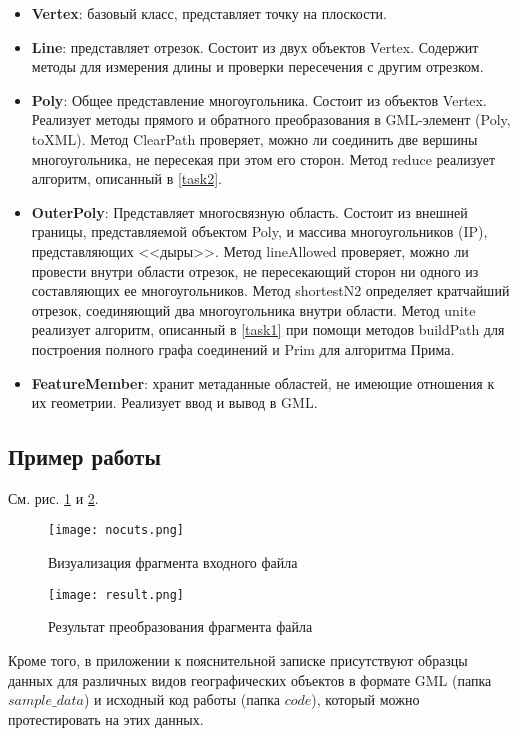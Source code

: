 \begin{itemize}
\item \textbf{Vertex}: базовый класс, представляет точку на плоскости.
\item \textbf{Line}: представляет отрезок. Состоит из двух объектов Vertex. Содержит методы для измерения длины и проверки пересечения с другим отрезком.
\item \textbf{Poly}: Общее представление многоугольника. Состоит из объектов Vertex. Реализует методы прямого и обратного преобразования в GML-элемент (Poly, toXML). Метод ClearPath проверяет, можно ли соединить две вершины многоугольника, не пересекая при этом его сторон. Метод reduce реализует алгоритм, описанный в \ref{task2}.
\item \textbf{OuterPoly}: Представляет многосвязную область. Состоит из внешней границы, представляемой объектом Poly, и массива многоугольников (IP), представляющих <<дыры>>. Метод lineAllowed проверяет, можно ли провести внутри области отрезок, не пересекающий сторон ни одного из составляющих ее многоугольников. Метод shortestN2 определяет кратчайший отрезок, соединяющий два многоугольника внутри области. Метод unite реализует алгоритм, описанный в \ref{task1} при помощи методов buildPath для построения полного графа соединений и Prim для алгоритма Прима.
\item \textbf{FeatureMember}: хранит метаданные областей, не имеющие отношения к их геометрии. Реализует ввод и вывод в GML.
\end{itemize}

\subsection{Пример работы}
\label{}

См. рис. \ref{fig:nocuts} и \ref{fig:result}.

\begin{figure}[!htb]
    \centering
    \texttt{[image: nocuts.png]}
    \caption{Визуализация фрагмента входного файла}
    \label{fig:nocuts}
\end{figure}

\begin{figure}[!htb]
    \centering
    \texttt{[image: result.png]}
    \caption{Результат преобразования фрагмента файла}
    \label{fig:result}
\end{figure}

Кроме того, в приложении к пояснительной записке присутствуют образцы данных для различных видов географических объектов в формате GML (папка $sample\_data$) и исходный код работы (папка $code$), который можно протестировать на этих данных.
